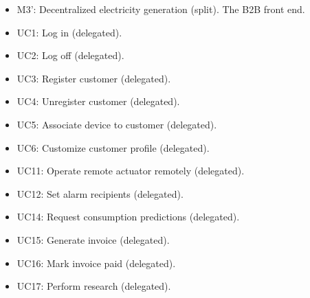 \begin{itemize}
\begin{itemize}
	  	\item M3': Decentralized electricity generation (split). The B2B front end.
	  	\item UC1: Log in (delegated).
	  	\item UC2: Log off (delegated).
	  	\item UC3: Register customer (delegated).
	  	\item UC4: Unregister customer (delegated).
	  	\item UC5: Associate device to customer (delegated).
	  	\item UC6: Customize customer profile (delegated).
	  	\item UC11: Operate remote actuator remotely (delegated).
	  	\item UC12: Set alarm recipients (delegated).
	  	\item UC14: Request consumption predictions (delegated).
	  	\item UC15: Generate invoice (delegated).
	  	\item UC16: Mark invoice paid (delegated).
	  	\item UC17: Perform research (delegated).
	\end{itemize}
\end{itemize}
